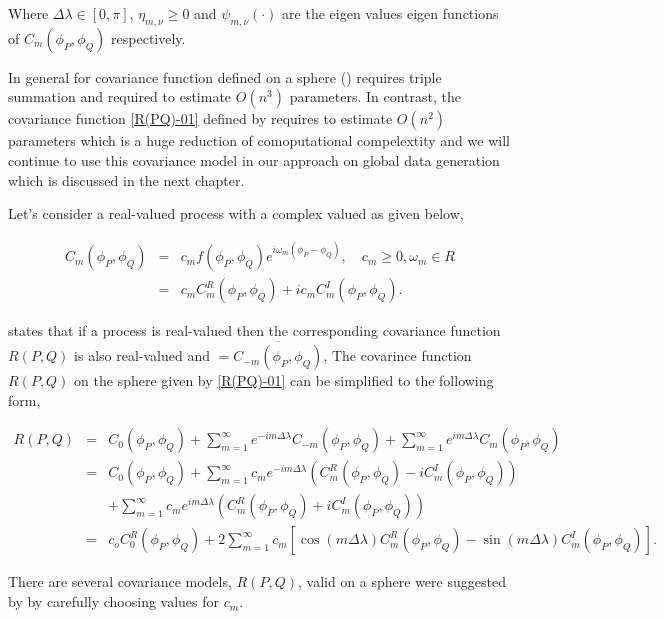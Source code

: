 		Where $\Delta\lambda \in [0, \pi]$, $\eta_{m,\nu}\ge 0$ and $\psi_{m,\nu}(\cdot)$ are the eigen values eigen functions of $C_m(\phi_P, \phi_Q)$ respectively.
		
		In general for covariance function defined on a sphere (\cite{Stein2007}) requires triple summation and required to estimate $O(n^3)$ parameters. In contrast, the covariance function \ref{R(PQ)-01} defined by \cite{Huang2012} requires to estimate $O(n^2)$ parameters which is a huge reduction of comoputational compelextity and we will continue to use this covariance model in our approach on global data generation which is discussed in the next chapter.
		
Let's consider a real-valued process with a complex valued \Cm as given below,

\begin{eqnarray*}
C_m(\phi_P,\phi_Q) &=& c_m f(\phi_P,\phi_Q)e^{i\omega_m(\phi_P-\phi_Q)}, \quad c_m \ge 0,\omega_m\in R \\
 &=& c_mC_m^{R}(\phi_P,\phi_Q) + i c_mC_m^{I}(\phi_P,\phi_Q).
\end{eqnarray*}

		\cite{Huang2012} states that if a process is real-valued then the corresponding covariance function $R(P,Q)$ is also real-valued and \Cm $= \overline{C_{-m}(\phi_P,\phi_Q)}$, The covarince function $R(P,Q)$ on the sphere given by \ref{R(PQ)-01} can be simplified to the following form,
		

\begin{eqnarray*}
R(P,Q) &=& C_0(\phi_P,\phi_Q) + \sum_{m=1}^{\infty} e^{-im\Delta\lambda}C_{-m}(\phi_P,\phi_Q) +  \sum_{m=1}^{\infty} e^{im\Delta\lambda}C_m(\phi_P,\phi_Q) \\ 
 &=& C_0(\phi_P,\phi_Q) + \sum_{m=1}^{\infty} c_m e^{-im\Delta\lambda}( C_m^{R}(\phi_P,\phi_Q) - i C_m^{I}(\phi_P,\phi_Q)) \\
 & &  + \sum_{m=1}^{\infty}c_m e^{im\Delta\lambda}( C_m^{R}(\phi_P,\phi_Q) + iC_m^{I}(\phi_P,\phi_Q)) \\ 
 &=& c_oC_{0}^{R}(\phi_P,\phi_Q)+2 \sum_{m=1}^{\infty}c_m[\cos(m\Delta\lambda)C_{m}^{R}(\phi_P,\phi_Q)-\sin(m\Delta\lambda)C_{m}^{I}(\phi_P,\phi_Q)].
\end{eqnarray*}


		There are several covariance models, $R(P,Q)$, valid on a sphere were suggested by \cite{Huang2012} by carefully choosing values for $c_m$.
		
